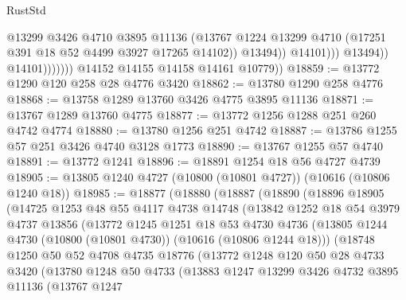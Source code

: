 \begin{lexlean}{RustStd}
\begin{coremodule}
                                    @13299
                                    @3426
                                    @4710
                                    @3895
                                    @11136
                                    (@13767
                                      @1224
                                      @13299
                                      @4710
                                      (@17251 @391 @18 @52 @4499 @3927 @17265 @14102))
                                    @13494))
                                @14101)))
                          @13494))
                      @14101)))))))
        @14152
        @14155
        @14158
        @14161
        @10779))
@18859 := @13772 @1290 @120 @258 @28 @4776 @3420
@18862 := @13780 @1290 @258 @4776
@18868 := @13758 @1289 @13760 @3426 @4775 @3895 @11136
@18871 := @13767 @1289 @13760 @4775
@18877 := @13772 @1256 @1288 @251 @260 @4742 @4774
@18880 := @13780 @1256 @251 @4742
@18887 := @13786 @1255 @57 @251 @3426 @4740 @3128 @1773
@18890 := @13767 @1255 @57 @4740
@18891 := @13772 @1241
@18896 := @18891 @1254 @18 @56 @4727 @4739
@18905 := @13805 @1240 @4727 (@10800 (@10801 @4727)) (@10616 (@10806 @1240 @18))
@18985 := @18877
    (@18880
      (@18887
        (@18890
          (@18896
            @18905
            (@14725
              @1253
              @48
              @55
              @4117
              @4738
              @14748
              (@13842
                @1252
                @18
                @54
                @3979
                @4737
                @13856
                (@13772
                  @1245
                  @1251
                  @18
                  @53
                  @4730
                  @4736
                  (@13805 @1244 @4730 (@10800 (@10801 @4730)) (@10616 (@10806 @1244 @18)))
                  (@18748
                    @1250
                    @50
                    @52
                    @4708
                    @4735
                    @18776
                    (@13772
                      @1248
                      @120
                      @50
                      @28
                      @4733
                      @3420
                      (@13780
                        @1248
                        @50
                        @4733
                        (@13883
                          @1247
                          @13299
                          @3426
                          @4732
                          @3895
                          @11136
                          (@13767
                            @1247

\end{coremodule}
\end{lexlean}
